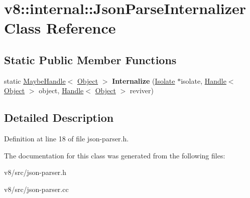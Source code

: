 \hypertarget{classv8_1_1internal_1_1JsonParseInternalizer}{}\section{v8\+:\+:internal\+:\+:Json\+Parse\+Internalizer Class Reference}
\label{classv8_1_1internal_1_1JsonParseInternalizer}
\subsection*{Static Public Member Functions}
\begin{DoxyCompactItemize}
\item 
\mbox{\label{classv8_1_1internal_1_1JsonParseInternalizer_a03627ce02f8895be7b25004faca6489b}} 
static \mbox{\hyperlink{classv8_1_1internal_1_1MaybeHandle}{Maybe\+Handle}}$<$ \mbox{\hyperlink{classv8_1_1internal_1_1Object}{Object}} $>$ {\bfseries Internalize} (\mbox{\hyperlink{classv8_1_1internal_1_1Isolate}{Isolate}} $\ast$isolate, \mbox{\hyperlink{classv8_1_1internal_1_1Handle}{Handle}}$<$ \mbox{\hyperlink{classv8_1_1internal_1_1Object}{Object}} $>$ object, \mbox{\hyperlink{classv8_1_1internal_1_1Handle}{Handle}}$<$ \mbox{\hyperlink{classv8_1_1internal_1_1Object}{Object}} $>$ reviver)
\end{DoxyCompactItemize}


\subsection{Detailed Description}


Definition at line 18 of file json-\/parser.\+h.



The documentation for this class was generated from the following files\+:\begin{DoxyCompactItemize}
\item 
v8/src/json-\/parser.\+h\item 
v8/src/json-\/parser.\+cc\end{DoxyCompactItemize}
